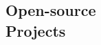 \documentclass[margin,line]{resume}
\begin{document}
\begin{resume}





\section{\mysidestyle Open-source\\Projects}


\end{resume}
\end{document}
